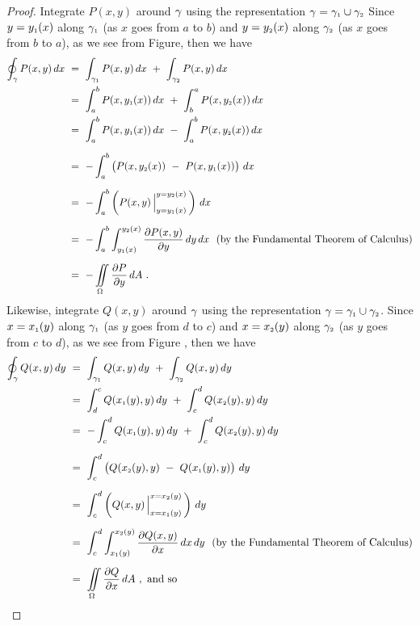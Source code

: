 \begin{proof}
 \par\noindent Integrate $P(x,y)$ around $\gamma$ using the representation $\gamma = \gamma_{\scriptscriptstyle 1} \cup \gamma_{\scriptscriptstyle 2}$
\noindent Since $y = y_{\scriptscriptstyle 1}(x)$ along $\gamma_{\scriptscriptstyle 1}$ (as $x$ goes from $a$ to $b$) and $y = y_{\scriptscriptstyle 2}(x)$ along
 $\gamma_{\scriptscriptstyle 2}$ (as $x$ goes from $b$ to $a$), as we see from Figure, then we have
 \begin{align*}
  \oint_\gamma P(x,y)\,dx ~&=~ \int_{\gamma_{\scriptscriptstyle 1}} P(x,y)\,dx ~+~ \int_{\gamma_{\scriptscriptstyle 2}} P(x,y)\,dx\\
   &=~ \int_a^b P(x,y_{\scriptscriptstyle 1}(x))\,dx ~+~ \int_b^a P(x,y_{\scriptscriptstyle 2}(x))\,dx\\
   &=~ \int_a^b P(x,y_{\scriptscriptstyle 1}(x))\,dx ~-~ \int_a^b P(x,y_{\scriptscriptstyle 2}(x))\,dx\\[6pt]
   &=~ -\int_a^b \left( P(x,y_{\scriptscriptstyle 2}(x)) ~-~ P(x,y_{\scriptscriptstyle 1}(x)) \right)\,dx\\[6pt]
   &=~ -\int_a^b \left( P(x,y) \,\Big|_{y = y_{\scriptscriptstyle 1}(x)}^{y = y_{\scriptscriptstyle 2}(x)} \,\right)\,dx\\[6pt]
   &=~ -\int_a^b \int_{y_{\scriptscriptstyle 1}(x)}^{y_{\scriptscriptstyle 2}(x)} \frac{\partial P(x,y)}{\partial y}\,dy\,dx ~~\text{(by the
    Fundamental Theorem of Calculus)}\\[6pt]
   &=~ -\iint\limits_{\Omega} \frac{\partial P}{\partial y}\,dA ~.
 \end{align*}
 Likewise, integrate $Q(x,y)$ around $\gamma$ using the representation $\gamma = \gamma_{\scriptscriptstyle 1} \cup \gamma_{\scriptscriptstyle 2}$.
 Since $x = x_{\scriptscriptstyle 1}(y)$ along $\gamma_{\scriptscriptstyle 1}$ (as $y$ goes from $d$ to $c$) and $x = x_{\scriptscriptstyle 2}(y)$ along
 $\gamma_{\scriptscriptstyle 2}$ (as $y$ goes from $c$ to $d$), as we see from Figure , then we have
 \begin{align*}
  \oint_\gamma Q(x,y)\,dy ~&=~ \int_{\gamma_{\scriptscriptstyle 1}} Q(x,y)\,dy ~+~ \int_{\gamma_{\scriptscriptstyle 2}} Q(x,y)\,dy\\
   &=~ \int_d^c Q(x_{\scriptscriptstyle 1}(y),y)\,dy ~+~ \int_c^d Q(x_{\scriptscriptstyle 2}(y),y)\,dy\\
   &=~ -\int_c^d Q(x_{\scriptscriptstyle 1}(y),y)\,dy ~+~ \int_c^d Q(x_{\scriptscriptstyle 2}(y),y)\,dy\\[6pt]
   &=~ \int_c^d \left( Q(x_{\scriptscriptstyle 2}(y),y) ~-~ Q(x_{\scriptscriptstyle 1}(y),y) \right)\,dy\\[6pt]
   &=~ \int_c^d \left( Q(x,y) \,\Big|_{x = x_{\scriptscriptstyle 1}(y)}^{x = x_{\scriptscriptstyle 2}(y)} \,\right)\,dy\\[6pt]
   &=~ \int_c^d \int_{x_{\scriptscriptstyle 1}(y)}^{x_{\scriptscriptstyle 2}(y)} \frac{\partial Q(x,y)}{\partial x}\,dx\,dy ~~\text{(by the
    Fundamental Theorem of Calculus)}\\[6pt]
   &=~ \iint\limits_{\Omega} \frac{\partial Q}{\partial x}\,dA ~,~\text{and so}
 \end{align*}


\end{proof}
